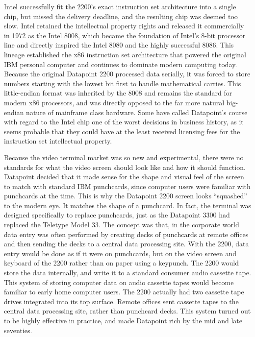 Intel successfully fit the 2200's exact instruction set architecture into a single chip, but missed the delivery deadline, and the resulting chip was deemed too slow. Intel retained the intellectual property rights and released it commercially in 1972 as the Intel 8008, which became the foundation of Intel's 8-bit processor line and directly inspired the Intel 8080 and the highly successful 8086. This lineage established the x86 instruction set architecture that powered the original IBM personal computer and continues to dominate modern computing today. Because the original Datapoint 2200 processed data serially, it was forced to store numbers starting with the lowest bit first to handle mathematical carries. This little-endian format was inherited by the 8008 and remains the standard for modern x86 processors, and was directly opposed to the far more natural big-endian nature of mainframe class hardware. Some have called Datapoint’s course with regard to the Intel chip one of the worst decisions in business history, as it seems probable that they could have at the least received licensing fees for the instruction set intellectual property.

Because the video terminal market was so new and experimental, there were no standards for what the video screen should look like and how it should function. Datapoint decided that it made sense for the shape and visual feel of the screen to match with standard IBM punchcards, since computer users were familiar with punchcards at the time. This is why the Datapoint 2200 screen looks “squashed” to the modern eye. It matches the shape of a punchcard. In fact, the terminal was designed specifically to replace punchcards, just as the Datapoint 3300 had replaced the Teletype Model 33. The concept was that, in the corporate world data entry was often performed by creating decks of punchcards at remote offices and then sending the decks to a central data processing site. With the 2200, data entry would be done as if it were on punchcards, but on the video screen and keyboard of the 2200 rather than on paper using a keypunch. The 2200 would store the data internally, and write it to a standard consumer audio cassette tape. This system of storing computer data on audio cassette tapes would become familiar to early home computer users. The 2200 actually had two cassette tape drives integrated into its top surface. Remote offices sent cassette tapes to the central data processing site, rather than punchcard decks. This system turned out to be highly effective in practice, and made Datapoint rich by the mid and late seventies.

